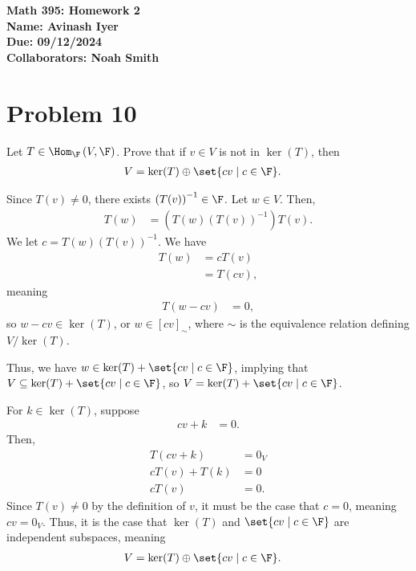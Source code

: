 \documentclass[10pt]{mypackage}
\begin{document}
\RaggedRight
\begin{center}
  \bfseries
  Math 395: Homework 2\\
  Name: Avinash Iyer\\
  Due: 09/12/2024\\
  Collaborators: Noah Smith
\end{center}
\section{Problem 10}%
\begin{problem}
  Let $T\in \Hom_{\F}\left(V,\F\right)$. Prove that if $v\in V$ is not in $\ker(T)$, then
  \begin{align*}
    V &= \ker(T) \oplus \set{cv\mid c\in\F}.
  \end{align*}
\end{problem}
\begin{solution}
  Since $T(v)\neq 0$, there exists $\left(T(v)\right)^{-1}\in \F$. Let $w\in V$. Then,
  \begin{align*}
    T(w) &= \left(T(w)\left(T(v)\right)^{-1}\right)T(v).
  \end{align*}
  We let $c = T(w)\left(T(v)\right)^{-1}$. We have
  \begin{align*}
    T(w) &= cT(v)\\
         &= T(cv),
  \end{align*}
  meaning
  \begin{align*}
    T\left(w - cv\right) &= 0,
  \end{align*}
  so $w-cv\in \ker(T)$, or $w\in \left[cv\right]_{\sim}$, where $\sim$ is the equivalence relation defining $V/\ker(T)$.\newline

  Thus, we have $w \in \ker(T) + \set{cv\mid c\in \F}$, implying that $V \subseteq \ker(T) + \set{cv\mid c\in \F}$, so $V = \ker(T) + \set{cv\mid c\in\F}$.\newline

  For $k\in\ker(T)$, suppose
  \begin{align*}
    cv + k &= 0.
  \end{align*}
  Then,
  \begin{align*}
    T\left(cv + k\right) &= 0_V\\
    cT\left(v\right) + T(k) &= 0\\
    cT\left(v\right) &= 0.
  \end{align*}
  Since $T(v)\neq 0$ by the definition of $v$, it must be the case that $c=0$, meaning $cv = 0_V$. Thus, it is the case that $\ker(T)$ and $\set{cv\mid c\in\F}$ are independent subspaces, meaning
  \begin{align*}
    V &= \ker(T)\oplus \set{cv\mid c\in\F}.
  \end{align*}
\end{solution}
\end{document}
